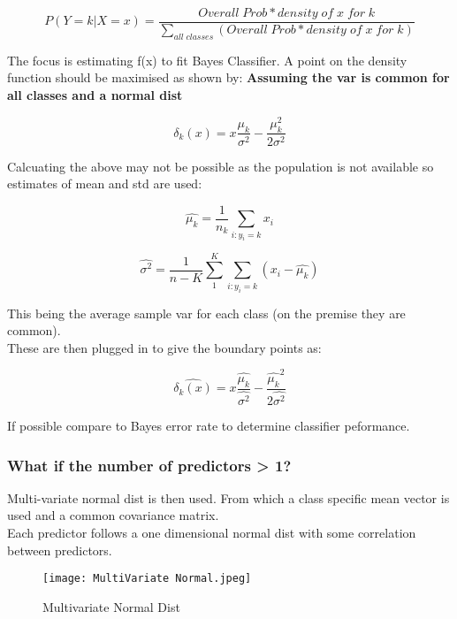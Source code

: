 \documentclass[11pt]{scrartcl} %
\begin{document}
\begin{equation}
	P(Y=k|X=x) = \frac{Overall\; Prob * density\; of \; x \; for \; k}{\sum_{all\; classes}(Overall\; Prob * density\; of \; x \; for \; k)}
\end{equation}

The focus is estimating f(x) to fit Bayes Classifier. A point on the density function should be maximised as shown by:
\textbf{Assuming the var is common for all classes and a normal dist}

\begin{equation}
	\delta_k(x) = x\frac{\mu_k}{\sigma^2} - \frac{\mu_k^2}{2\sigma^2}
\end{equation}

Calcuating the above may not be possible as the population is not available so estimates of mean and std are used:

\begin{equation}
	\hat{\mu_k} = \frac{1}{n_k}\sum_{i:y_i=k}{x_i}
\end{equation}


\begin{equation}
	\hat{\sigma^2}  = \frac{1}{n-K}\sum^K_1\sum_{i:y_i=k}(x_i - \hat{\mu_k})
\end{equation}

This being the average sample var for each class (on the premise they are common).\\

These are then plugged in to give the boundary points as:

\begin{equation}
	\hat{\delta_k(x)} = x\frac{\hat{\mu_k}}{\hat{\sigma^2}} - \frac{\hat{\mu_k}^2}{2\hat{\sigma^2}}
\end{equation}

If possible compare to Bayes error rate to determine classifier peformance.

\subsubsection{What if the number of predictors > 1?}

Multi-variate normal dist is then used. From which a class specific mean vector is used and a common covariance matrix.\\

Each predictor follows a one dimensional normal dist with some correlation between predictors.

\begin{figure}[h] %
	\centering
	\texttt{[image: MultiVariate Normal.jpeg]} %
	\caption{Multivariate Normal Dist}
	\label{multi-normal}
\end{figure}
\end{document}
